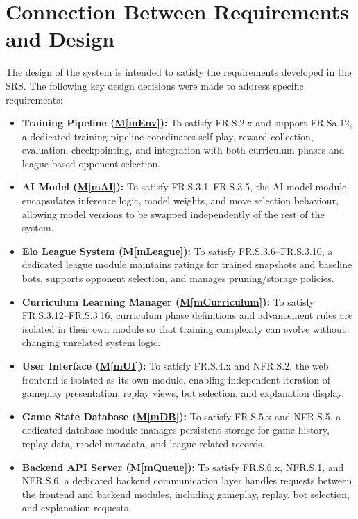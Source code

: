 \documentclass[12pt, titlepage]{article}
\newcommand{\mref}[1]{\hyperref[sec:#1]{M\ref*{#1}}}
\begin{document}
\section{Connection Between Requirements and Design} \label{SecConnection}

The design of the system is intended to satisfy the requirements developed in
the SRS. The following key design decisions were made to address specific requirements:

\begin{itemize}
    \item \textbf{Training Pipeline (\mref{mEnv}):} To satisfy FR.S.2.x and support FR.Sa.12, a dedicated training pipeline coordinates self-play, reward collection, evaluation, checkpointing, and integration with both curriculum phases and league-based opponent selection.

    \item \textbf{AI Model (\mref{mAI}):} To satisfy FR.S.3.1--FR.S.3.5, the AI model module encapsulates inference logic, model weights, and move selection behaviour, allowing model versions to be swapped independently of the rest of the system.

    \item \textbf{Elo League System (\mref{mLeague}):} To satisfy FR.S.3.6--FR.S.3.10, a dedicated league module maintains ratings for trained snapshots and baseline bots, supports opponent selection, and manages pruning/storage policies.

    \item \textbf{Curriculum Learning Manager (\mref{mCurriculum}):} To satisfy FR.S.3.12--FR.S.3.16, curriculum phase definitions and advancement rules are isolated in their own module so that training complexity can evolve without changing unrelated system logic.

    \item \textbf{User Interface (\mref{mUI}):} To satisfy FR.S.4.x and NFR.S.2, the web frontend is isolated as its own module, enabling independent iteration of gameplay presentation, replay views, bot selection, and explanation display.

    \item \textbf{Game State Database (\mref{mDB}):} To satisfy FR.S.5.x and NFR.S.5, a dedicated database module manages persistent storage for game history, replay data, model metadata, and league-related records.

    \item \textbf{Backend API Server (\mref{mQueue}):} To satisfy FR.S.6.x, NFR.S.1, and NFR.S.6, a dedicated backend communication layer handles requests between the frontend and backend modules, including gameplay, replay, bot selection, and explanation requests.


\end{itemize}
\end{document}
